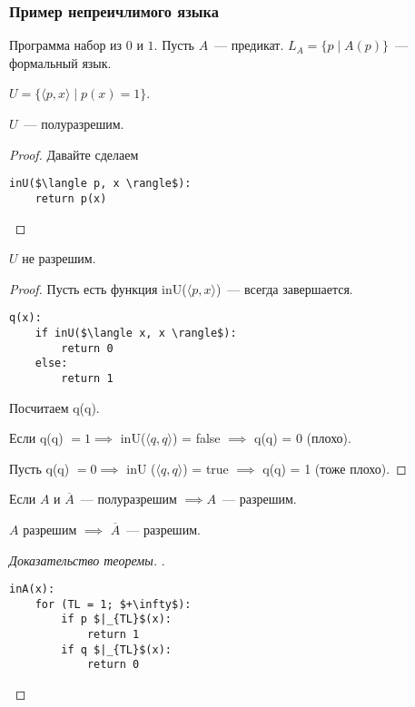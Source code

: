 \subsubsection*{Пример непреичлимого языка}

Программа набор из $0$ и $1$.
Пусть $A$~--- предикат.
$L_A = \{ p \mid A(p) \}$~--- формальный язык.

\begin{definition}
     $U = \{ \langle p, x \rangle \mid p(x) = 1\}$.
\end{definition}

\begin{note}
$U$~--- полуразрешим.
\end{note}
\begin{proof}
    Давайте сделаем
\begin{lstlisting}[mathescape=true]
inU($\langle p, x \rangle$):
    return p(x)
\end{lstlisting}
\end{proof}

\begin{theorem}
    $U$ не разрешим.
\end{theorem}
\begin{proof}
    Пусть есть функция inU($\langle p, x \rangle$)~--- всегда завершается.
\begin{lstlisting}[mathescape=true]
q(x):
    if inU($\langle x, x \rangle$):
        return 0
    else:
        return 1
\end{lstlisting}
Посчитаем q(q).

Если q(q) $= 1\implies $ inU($\langle q, q \rangle$) = false $\implies$ q(q) = 0 (плохо).

Пусть q(q) $= 0 \implies $ inU ($\langle q, q \rangle $) = true
$\implies$ q(q) = 1 (тоже плохо).

\end{proof}

\begin{theorem}
    Если $A$ и $\overline{A}$~--- полуразрешим $\implies A$~--- разрешим.
\end{theorem}

\begin{statement}
    $A$ разрешим $\implies $ $\overline{A}$~--- разрешим.
\end{statement}

\begin{proof}[Доказательство теоремы]
.
\begin{lstlisting}[mathescape=true]
inA(x):
    for (TL = 1; $+\infty$):
        if p $|_{TL}$(x):
            return 1
        if q $|_{TL}$(x):
            return 0
\end{lstlisting}
\end{proof}

